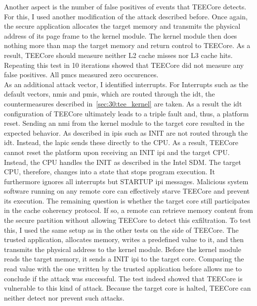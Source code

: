 Another aspect is the number of false positives of events that TEECore detects.
For this, I used another modification of the attack described before. Once
again, the secure application allocates the target memory and transmits the
physical address of its page frame to the kernel module. The kernel module then
does nothing more than map the target memory and return control to TEECore. As a
result, TEECore should measure neither L2 cache misses nor L3 cache hits.
Repeating this test in 10 iterations showed that TEECore did not measure any
false positives. All \glspl{pmc} measured zero occurences.\\

As an additional attack vector, I identified interrupts. For Interrupts such as
the default vectors, \glspl{nmi} and \glspl{pmi}, which are routed through the
\gls{idt}, the countermeasures described in~\ref{sec:30:tee_kernel} are taken.
As a result the \gls{idt} configuration of TEECore ultimately leads to a triple
fault and, thus, a platform reset. Sending an \gls{nmi} from the kernel module
to the target core resulted in the expected behavior. As described in
 \glspl{ipi} such as INIT are not routed through the \gls{idt}.
Instead, the \gls{lapic} sends these directly to the CPU. As a result, TEECore
cannot reset the platform upon receiving an INIT \gls{ipi} and the target CPU.
Instead, the CPU handles the INIT as described in the Intel SDM. The target CPU,
therefore, changes into a state that stops program execution. It furthermore
ignores all interrupts but STARTUP \gls{ipi} messages. Malicious system software
running on any remote core can effectively starve TEECore and prevent its
execution. The remaining question is whether the target core still participates
in the cache coherency protocol. If so, a remote can retrieve memory content
from the secure partition without allowing TEECore to detect this exfiltration.
To test this, I used the same setup as in the other tests on the side of
TEECore. The trusted application, allocates memory, writes a predefined value to
it, and then transmits the physical address to the kernel module. Before the
kernel module reads the target memory, it sends a INIT \gls{ipi} to the target
core. Comparing the read value with the one written by the trusted application
before allows me to conclude if the attack was successful. The test indeed
showed that TEECore is vulnerable to this kind of attack. Because the target
core is halted, TEECore can neither detect nor prevent such attacks.

